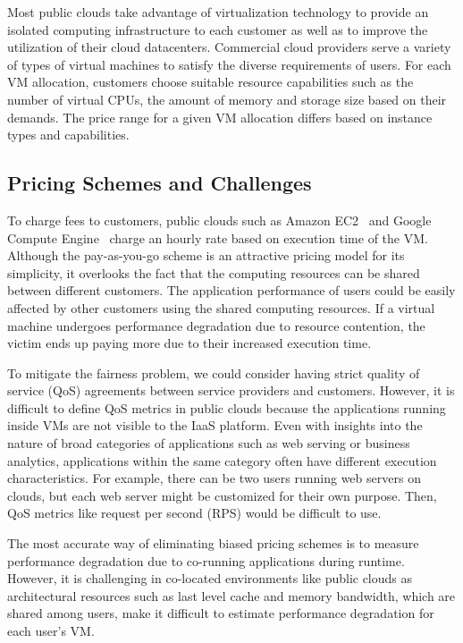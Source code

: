 \documentclass{sig-alternate}
\begin{document}
Most public clouds take advantage of virtualization technology to provide an isolated computing infrastructure to each customer as well as to improve the utilization of their cloud datacenters.  Commercial cloud providers serve a variety of types of virtual machines to satisfy the diverse requirements of users. For each VM allocation, customers choose suitable resource capabilities such as the number of virtual CPUs, the amount of memory and storage size based on their demands. The price range for a given VM allocation differs based on instance types and capabilities.
\subsection{Pricing Schemes and Challenges}
\label{subsec:PricingSchemesandChallenges}

To charge fees to customers, public clouds such as Amazon EC2~\cite{aws-pricing} and Google Compute Engine~\cite{gce-pricing} charge an hourly rate based on execution time of the VM. Although the pay-as-you-go scheme is an attractive pricing model for its simplicity, it overlooks the fact that the computing resources can be shared between different customers. The application performance of users could be easily affected by other customers using the shared computing resources. If a virtual machine undergoes performance degradation due to resource contention, the victim ends up paying more due to their increased execution time. 

To mitigate the fairness problem, we could consider having strict quality of service (QoS) agreements between service providers and customers. However, it is difficult to define QoS metrics in public clouds because the applications running inside VMs are not visible to the IaaS platform. Even with insights into the nature of broad categories of applications such as web serving or business analytics, applications within the same category often have different execution characteristics. For example, there can be two users running web servers on clouds, but each web server might be customized for their own purpose. Then, QoS metrics like request per second (RPS) would be difficult to use.

The most accurate way of eliminating biased pricing schemes is to measure performance degradation due to co-running applications during runtime. However, it is challenging in co-located environments like public clouds as architectural resources such as last level cache and memory bandwidth, which are shared among users, make it difficult to estimate performance degradation for each user's VM.
\end{document}
